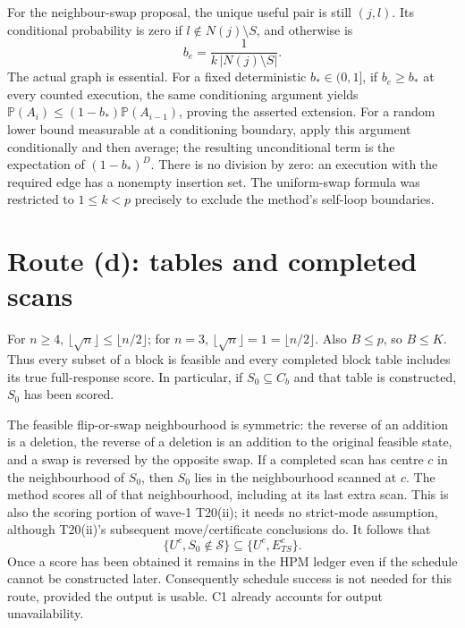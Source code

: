 ﻿\documentclass[11pt]{article}
\newcommand{\Pp}{\mathbb P}
\newcommand{\1}{\mathbf 1}
\newcommand{\Sc}{\mathcal S}
\begin{document}
For the neighbour-swap proposal, the unique useful pair is still
\((j,l)\). Its conditional probability is zero if
\(l\notin N(j)\setminus S\), and otherwise is
\[
 b_e=\frac1{k\,|N(j)\setminus S|}.
\]
The actual graph is essential. For a fixed deterministic \(b_*\in(0,1]\), if \(b_e\ge b_*\) at every counted
execution, the same conditioning argument yields
\(\Pp(A_i)\le(1-b_*)\Pp(A_{i-1})\), proving the asserted extension.
For a random lower bound measurable at a conditioning boundary, apply this argument conditionally and then average; the resulting unconditional term is the expectation of \((1-b_*)^D\). There is no division by zero: an execution with the required edge has a
nonempty insertion set. The uniform-swap formula was restricted to
\(1\le k<p\) precisely to exclude the method's self-loop boundaries.

\section{Route (d): tables and completed scans}
For \(n\ge4\), \(\lfloor\sqrt n\rfloor\le\lfloor n/2\rfloor\);
for \(n=3\), \(\lfloor\sqrt n\rfloor=1=\lfloor n/2\rfloor\).
Also \(B\le p\), so \(B\le K\). Thus every subset of a block is
feasible and every completed block table includes its true full-response
score. In particular, if \(S_0\subseteq C_b\) and that table is
constructed, \(S_0\) has been scored.

The feasible flip-or-swap neighbourhood is symmetric: the reverse of an
addition is a deletion, the reverse of a deletion is an addition to the
original feasible state, and a swap is reversed by the opposite swap.
If a completed scan has centre \(c\) in the neighbourhood of \(S_0\),
then \(S_0\) lies in the neighbourhood scanned at \(c\). The method
scores all of that neighbourhood, including at its last extra scan.
This is also the scoring portion of wave-1 T20(ii); it needs no strict-mode
assumption, although T20(ii)'s subsequent move/certificate conclusions do.
It follows that
\[
 \{U^c,S_0\notin\Sc\}\subseteq\{U^c,E_{TS}^c\}.
\]
Once a score has been obtained it remains in the HPM ledger even if the
schedule cannot be constructed later. Consequently schedule success is not
needed for this route, provided the output is usable. C1 already accounts
for output unavailability.
\end{document}
